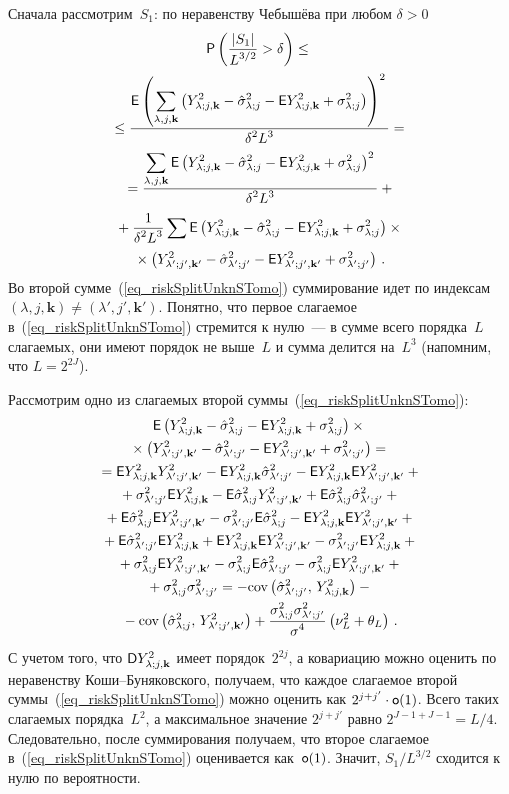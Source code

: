 \begin{multicols}{2}
Сначала рассмотрим~$S_1$: по неравенству Чебышёва при любом $\delta>0$
\begin{multline}
\p\left( \fr{|S_1|}{L^{3/2}} > \delta \right) \leq{}\\
{}\leq
\fr{ \e\left( \sumljk \left( \Yljk^2 - \hslj - \e\Yljk^2 + \slj \right) \right)^2 }{\delta^2 L^3} ={}\\
{}= \fr{ \sumljk \e\left( \Yljk^2 - \hslj - \e\Yljk^2 + \slj \right)^2 }{ \delta^2 L^3 } + {}\\
{}+ \fr{1}{\delta^2 L^3}
 \sum \e\left( \Yljk^2 - \hslj - \e\Yljk^2 + \slj \right)\times{}\\
 {}\times \left( \Yljks^2 - \hsljs - \e\Yljks^2 + \sljs \right)\,.
\label{eq_riskSplitUnknSTomo}
\end{multline}
Во второй сумме~(\ref{eq_riskSplitUnknSTomo}) суммирование идет по индексам 
$(\lambda,j,\mathbf{k})\ne(\lambda',j',\mathbf{k}')$. Понятно, что первое слагаемое в~(\ref{eq_riskSplitUnknSTomo}) 
стремится к нулю~--- в сумме всего порядка~$L$ слагаемых, они имеют порядок не выше~$L$ и 
сумма делится на~$L^3$ (напомним, что $L=2^{2J}$).

Рассмотрим одно из слагаемых второй суммы~(\ref{eq_riskSplitUnknSTomo}):
\begin{multline*}
\e\left( \Yljk^2 - \hslj - \e\Yljk^2 + \slj \right) \times{}\\
{}\times\left( \Yljks^2 - \hsljs - \e\Yljks^2 + \sljs \right) = {}\\
{}= \e\Yljk^2\Yljks^2 - \e\Yljk^2\hsljs - \e\Yljk^2 \e\Yljks^2 +{}\\
{}+ \sljs \e\Yljk^2 - 
 \e\hslj\Yljks^2 + \e\hslj\hsljs +{}\\
 {}+ \e\hslj\e\Yljks^2 - \sljs\e\hslj 
- \e\Yljk^2 \e\Yljks^2 +{}\\
{}+ \e\hsljs\e\Yljk^2 + \e\Yljk^2 \e\Yljks^2 - \sljs\e\Yljk^2 
+ {}\\
{}+\slj\e\Yljks^2 - \slj\e\hsljs - \slj\e\Yljks^2 +{}\\
{}+ \slj\sljs = 
 - \cov\left( \hsljs,\,\Yljk^2 \right) -{}\\
 {}- \cov\left( \hslj,\,\Yljks^2 \right) +
 \fr{\slj\sljs}{\sigma^4}\left( \nu_L^2 + \theta_L \right)\,.
\end{multline*}
С учетом того, что $\D\Yljk^2$ имеет порядок~$2^{2j}$, а ковариацию можно оценить по неравенству Коши--Бу\-ня\-ков\-ско\-го, 
получаем, что каждое слагаемое второй суммы~(\ref{eq_riskSplitUnknSTomo}) можно оценить как 
$2^{j+j'}\cdot\osml(1)$. Всего таких слагаемых порядка~$L^2$, а максимальное значение $2^{j+j'}$ 
равно $2^{J-1+J-1}=L/4$. Следовательно, после суммирования получаем, что второе сла\-га\-емое 
в~(\ref{eq_riskSplitUnknSTomo}) оценивается как~$\osml(1)$. Значит, $S_1/L^{3/2}$ сходится к нулю по вероятности.


\end{multicols}
